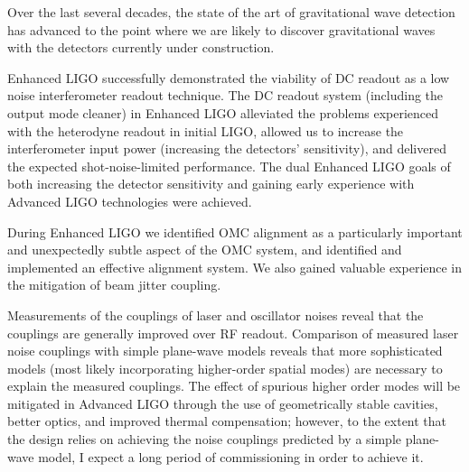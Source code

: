 \label{conclusion}

Over the last several decades, the state of the art of gravitational
wave detection has advanced to the point where we are likely to
discover gravitational waves with the detectors currently under
construction.

Enhanced LIGO successfully demonstrated the viability of DC readout as
a low noise interferometer readout technique.  The DC readout system
(including the output mode cleaner) in Enhanced LIGO alleviated the
problems experienced with the heterodyne readout in initial LIGO,
allowed us to increase the interferometer input power (increasing the
detectors' sensitivity), and delivered the expected shot-noise-limited
performance.  The dual Enhanced LIGO goals of both increasing the
detector sensitivity and gaining early experience with Advanced LIGO
technologies were achieved.

During Enhanced LIGO we identified OMC alignment as a particularly
important and unexpectedly subtle aspect of the OMC system, and
identified and implemented an effective alignment system.  We also
gained valuable experience in the mitigation of beam jitter coupling.

Measurements of the couplings of laser and oscillator noises reveal
that the couplings are generally improved over RF readout.  Comparison
of measured laser noise couplings with simple plane-wave models
reveals that more sophisticated models (most likely incorporating
higher-order spatial modes) are necessary to explain the measured
couplings.  The effect of spurious higher order modes will be
mitigated in Advanced LIGO through the use of geometrically stable
cavities, better optics, and improved thermal compensation; however,
to the extent that the design relies on achieving the noise couplings
predicted by a simple plane-wave model, I expect a long period of
commissioning in order to achieve it.  



